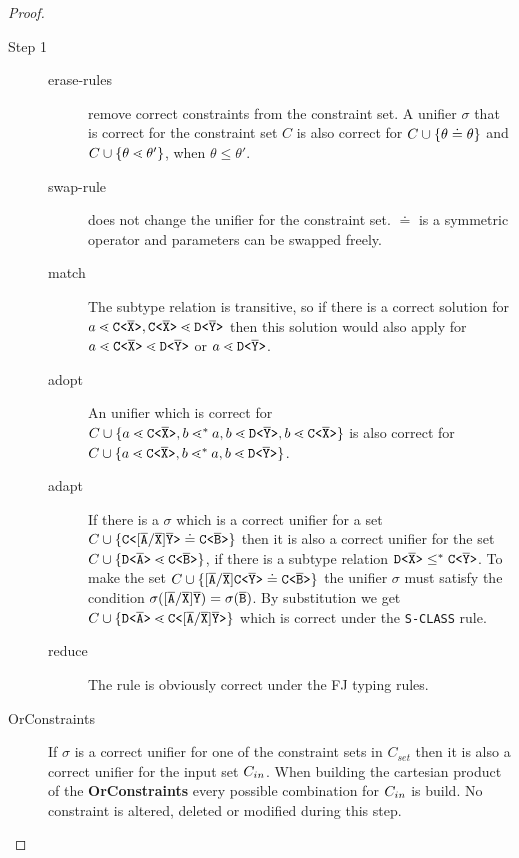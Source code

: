 \begin{proof}
\begin{description}
\item[Step 1]
\begin{description}
\item[erase-rules] remove correct constraints from the constraint set.
A unifier $\sigma$ that is correct for the constraint set $C$
is also correct for $C \cup \{ \theta \doteq \theta \}$
and $C \cup \{ \theta \lessdot \theta' \}$, when $\theta \leq \theta'$.
\item[swap-rule] does not change the unifier for the constraint set.
$\doteq$ is a symmetric operator and parameters can be swapped freely.
\item[match] The subtype relation is transitive, so if there is a correct solution for
$a \lessdot \mathtt{C \texttt{<} \overline{\tt X} \texttt{>} }, \mathtt{C \texttt{<} \overline{\tt X} \texttt{>} } \lessdot \mathtt{D \texttt{<} \overline{\tt Y} \texttt{>} }$
then this solution would also apply for $a \lessdot \mathtt{C \texttt{<} \overline{\tt X} \texttt{>} } \lessdot \mathtt{D \texttt{<} \overline{\tt Y} \texttt{>} }$
or $a \lessdot \mathtt{D \texttt{<} \overline{\tt Y} \texttt{>} }$.
\item[adopt] An unifier which is correct for $C \cup \{ a \lessdot \mathtt{C \texttt{<} \overline{\tt X} \texttt{>} }, b \lessdot^* a, b \lessdot \mathtt{D \texttt{<} \overline{\tt Y} \texttt{>} }, b \lessdot \mathtt{C \texttt{<} \overline{\tt X} \texttt{>} } \}$
is also correct for $C \cup \{ a \lessdot \mathtt{C \texttt{<} \overline{\tt X} \texttt{>} }, b \lessdot^* a, b \lessdot \mathtt{D \texttt{<} \overline{\tt Y} \texttt{>} } \}$.
\item[adapt] If there is a $\sigma$ which is a correct unifier for a set
$C \cup \{  \mathtt{C \texttt{<} [\overline{\tt A}/\overline{\tt X}]\overline{\tt Y} \texttt{>} } \doteq \mathtt{C \texttt{<} \overline{\tt B} \texttt{>} } \}$ then it is also
a correct unifier for the set $C \cup \{  \mathtt{D \texttt{<} \overline{\tt A} \texttt{>} } \lessdot \mathtt{C \texttt{<} \overline{\tt B} \texttt{>} } \}$,
if there is a subtype relation $\mathtt{D \texttt{<} \overline{\tt X} \texttt{>} } \leq^* \mathtt{C \texttt{<} \overline{\tt Y} \texttt{>} }$.
To make the set $C \cup \{  [\overline{\tt A}/\overline{\tt X}]\mathtt{C \texttt{<} \overline{\tt Y} \texttt{>} } \doteq \mathtt{C \texttt{<} \overline{\tt B} \texttt{>} } \}$ the unifier 
$\sigma$ must satisfy the condition $\sigma([\overline{\tt A}/\overline{\tt X}]\overline{\tt Y}) = \sigma(\overline{\tt B})$.
By substitution we get $C \cup \{  \mathtt{D \texttt{<} \overline{\tt A} \texttt{>} } \lessdot \mathtt{C \texttt{<} [\overline{\tt A}/\overline{\tt X}]\overline{\tt Y} \texttt{>} } \}$
which is correct under the \texttt{S-CLASS} rule.
\item[reduce] The  rule is obviously correct under the FJ typing rules.
\end{description}

\item[OrConstraints]
If $\sigma$ is a correct unifier for one of the constraint sets in $C_{set}$
then it is also a correct unifier for the input set $C_{in}$.
When building the cartesian product of the \textbf{OrConstraints} every possible
combination for $C_{in}$ is build.
No constraint is altered, deleted or modified during this step.
\end{description}
\end{proof}

